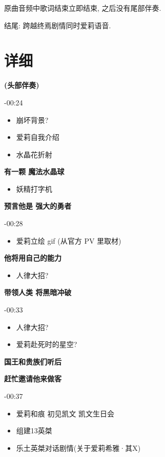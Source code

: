 \documentclass[a4paper]{article}
\begin{document}
原曲音频中歌词结束立即结束, 之后没有尾部伴奏.

结尾: 跨越终焉剧情同时爱莉语音.

\section{详细}

\textbf{(头部伴奏)}

-00:24

\begin{itemize}
    \item 崩坏背景?
    \item 爱莉自我介绍
    \item 水晶花折射
\end{itemize}

\textbf{有一颗 魔法水晶球}

\begin{itemize}
    \item 妖精打字机
\end{itemize}

\textbf{预言他是 强大的勇者}

-00:28

\begin{itemize}
    \item 爱莉立绘 gif (从官方 PV 里取材)
\end{itemize}

\textbf{他将用自己的能力}

\begin{itemize}
    \item 人律大招?
\end{itemize}

\textbf{带领人类 将黑暗冲破}

-00:33

\begin{itemize}
    \item 人律大招?
    \item 爱莉赴死时的星空?
\end{itemize}

\textbf{国王和贵族们听后}

\textbf{赶忙邀请他来做客}

-00:37

\begin{itemize}
    \item 爱莉和痕 初见凯文 凯文生日会
    \item 组建13英桀
    \item 乐土英桀对话剧情(关于爱莉希雅·其X)
\end{itemize}
\end{document}
